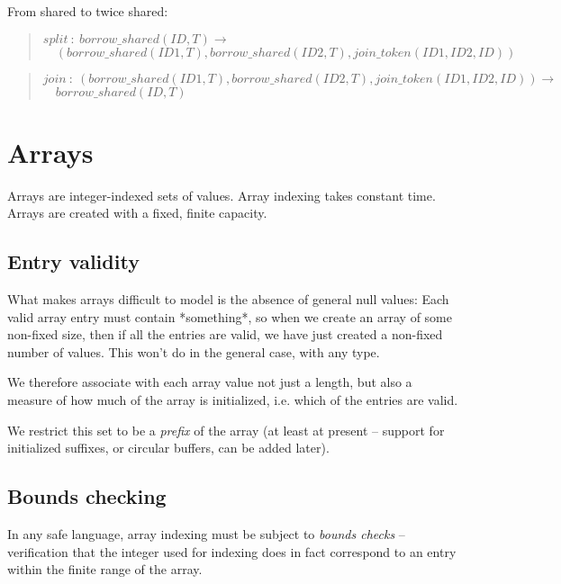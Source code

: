 \documentclass[a4paper]{book}
\newcommand\FuncSignatureII[3]{\begin{quote}$\mathit{#1}\ :\ \mathit{#2} \to$\\${}\quad \mathit{#3}$ \end{quote}}
\begin{document}
\noindent
From shared to twice shared:

\FuncSignatureII{split}
{borrow\_shared(ID, T)}
{(borrow\_shared(ID1, T), borrow\_shared(ID2, T), join\_token(ID1,ID2,ID))}

\FuncSignatureII{join}
{(borrow\_shared(ID1, T), borrow\_shared(ID2, T), join\_token(ID1,ID2,ID))}
{borrow\_shared(ID, T)}





\chapter{Arrays}

Arrays are integer-indexed sets of values.
Array indexing takes constant time.
Arrays are created with a fixed, finite capacity.

\section{Entry validity}

What makes arrays difficult to model is the absence of general null values:
Each valid array entry must contain *something*, so when we create an
array of some non-fixed size, then if all the entries are valid, we
have just created a non-fixed number of values.
This won't do in the general case, with any type.

We therefore associate with each array value not just a length, but
also a measure of how much of the array is initialized, i.e. which of
the entries are valid.

We restrict this set to be a \emph{prefix} of the array (at least at
present -- support for initialized suffixes, or circular buffers, can
be added later).

\section{Bounds checking}
In any safe language, array indexing must be subject to \emph{bounds checks}
-- verification that the integer used for indexing does in fact correspond to
an entry within the finite range of the array.
\end{document}

